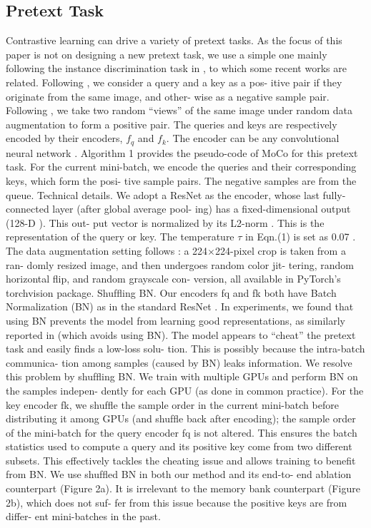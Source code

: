 \documentclass[10pt,twocolumn]{article}  %
\begin{document}
\subsection{Pretext Task}
Contrastive learning can drive a variety of pretext tasks.
As the focus of this paper is not on designing a new pretext
task, we use a simple one mainly following the instance
discrimination task in \cite{61_wu2018unsupervised},
to which some recent works \cite{63_ye2019unsupervised, 2_bachman2019learning} are related.
Following \cite{61_wu2018unsupervised}, we consider a query and a key as a pos-
itive pair if they originate from the same image, and other-
wise as a negative sample pair. Following \cite{63_ye2019unsupervised, 2_bachman2019learning}, we take
two random “views” of the same image under random data
augmentation to form a positive pair. The queries and keys
are respectively encoded by their encoders, $f_q$ and $f_k$. The
encoder can be any convolutional neural network \cite{39_lecun1989backpropagation}.
Algorithm 1 provides the pseudo-code of MoCo for this
pretext task. For the current mini-batch, we encode the
queries and their corresponding keys, which form the posi-
tive sample pairs. The negative samples are from the queue.
Technical details. We adopt a ResNet \cite{39_lecun1989backpropagation} as the encoder,
whose last fully-connected layer (after global average pool-
ing) has a ﬁxed-dimensional output (128-D \cite{61_wu2018unsupervised}). This out-
put vector is normalized by its L2-norm \cite{61_wu2018unsupervised}. This is the
representation of the query or key. The temperature $\tau$ in
Eqn.(1) is set as 0.07 \cite{61_wu2018unsupervised}. The data augmentation setting
follows \cite{61_wu2018unsupervised}: a 224$\times$224-pixel crop is taken from a ran-
domly resized image, and then undergoes random color jit-
tering, random horizontal ﬂip, and random grayscale con-
version, all available in PyTorch's torchvision package.
Shufﬂing BN. Our encoders fq and fk both have Batch
Normalization (BN) \cite{37_ioffe2015batch} as in the standard ResNet \cite{33_he2016deep}. In
experiments, we found that using BN prevents the model
from learning good representations, as similarly reported
in \cite{35_henaff2019data} (which avoids using BN). The model appears to
“cheat” the pretext task and easily ﬁnds a low-loss solu-
tion. This is possibly because the intra-batch communica-
tion among samples (caused by BN) leaks information.
We resolve this problem by shufﬂing BN. We train with
multiple GPUs and perform BN on the samples indepen-
dently for each GPU (as done in common practice). For the
key encoder fk, we shufﬂe the sample order in the current
mini-batch before distributing it among GPUs (and shufﬂe
back after encoding); the sample order of the mini-batch
for the query encoder fq is not altered. This ensures the
batch statistics used to compute a query and its positive key
come from two different subsets. This effectively tackles
the cheating issue and allows training to beneﬁt from BN.
We use shufﬂed BN in both our method and its end-to-
end ablation counterpart (Figure 2a). It is irrelevant to the
memory bank counterpart (Figure 2b), which does not suf-
fer from this issue because the positive keys are from differ-
ent mini-batches in the past.
\end{document}
